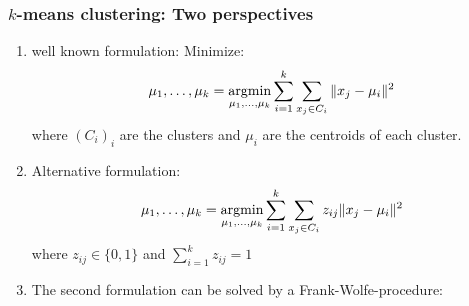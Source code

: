 \documentclass[10pt,aspectratio=169,handout]{beamer}
\begin{document}
\begin{frame}
    \frametitle{$k$-means clustering: Two perspectives}

    \begin{enumerate}
        \item well known formulation: Minimize:\[\mu_1,\dots,\mu_k=\operatorname*{argmin}_{\mu_1,\dots,\mu_k} \sum_{i=1}^k\sum_{x_j\in C_i} \Vert x_j-\mu_i\Vert^2\]
        where $(C_i)_i$ are the clusters and $\mu_i$ are the centroids of each cluster.
        \item Alternative formulation: \[\mu_1,\dots,\mu_k=\operatorname*{argmin}_{\mu_1,\dots,\mu_k} \sum_{i=1}^k\sum_{x_j\in C_i} z_{ij}\Vert x_j-\mu_i\Vert^2\]
        where $z_{ij}\in\{0,1\}$ and $\sum_{i=1}^{k}z_{ij}=1$
        \item  The second formulation can be solved by a Frank-Wolfe-procedure:
    \end{enumerate}

\end{frame}

\begin{frame}

    \inputminted[bgcolor=LightGray,fontsize=\small]{python}{code/fw_kmeans_v1.py}
    \vspace{-5mm}
    \inputminted[bgcolor=LightGray,fontsize=\small]{python}{code/fw_update_z.py}

\end{frame}
\end{document}
